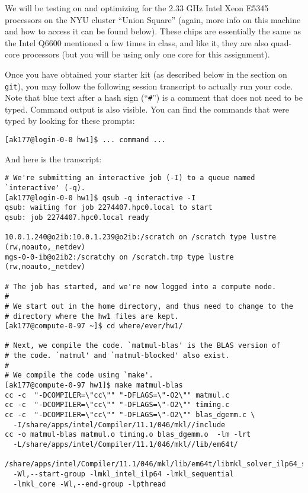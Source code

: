 \documentclass[11pt]{article}
\begin{document}
\begin{enumerate}
\begin{itemize}
\end{itemize}


We will be testing on and optimizing for the 2.33 GHz Intel Xeon E5345
processors on the NYU cluster ``Union Square'' (again, more info on
this machine and how to access it can be found below). These chips are
essentially the same as the Intel Q6600 mentioned a few times in
class, and like it, they are also quad-core processors (but you will
be using only one core for this assignment).

Once you have obtained your starter kit (as described below in the
section on \texttt{git}), you may follow the following session
transcript to actually run your code. Note that blue text after a hash
sign (``\texttt{\#}'') is a comment that does not need to be typed.
Command output is also visible. You can find the commands that were
typed by looking for these prompts:
\begin{lstlisting}
[ak177@login-0-0 hw1]$ ... command ...
\end{lstlisting}

And here is the transcript:

\begin{lstlisting}
# We're submitting an interactive job (-I) to a queue named `interactive' (-q).
[ak177@login-0-0 hw1]$ qsub -q interactive -I
qsub: waiting for job 2274407.hpc0.local to start
qsub: job 2274407.hpc0.local ready

10.0.1.240@o2ib:10.0.1.239@o2ib:/scratch on /scratch type lustre (rw,noauto,_netdev)
mgs-0-0-ib@o2ib2:/scratchy on /scratch.tmp type lustre (rw,noauto,_netdev)

# The job has started, and we're now logged into a compute node.
#
# We start out in the home directory, and thus need to change to the
# directory where the hw1 files are kept.
[ak177@compute-0-97 ~]$ cd where/ever/hw1/

# Next, we compile the code. `matmul-blas' is the BLAS version of
# the code. `matmul' and `matmul-blocked' also exist.
#
# We compile the code using `make'.
[ak177@compute-0-97 hw1]$ make matmul-blas
cc -c  "-DCOMPILER=\"cc\"" "-DFLAGS=\"-O2\"" matmul.c
cc -c  "-DCOMPILER=\"cc\"" "-DFLAGS=\"-O2\"" timing.c
cc -c  "-DCOMPILER=\"cc\"" "-DFLAGS=\"-O2\"" blas_dgemm.c \
  -I/share/apps/intel/Compiler/11.1/046/mkl//include
cc -o matmul-blas matmul.o timing.o blas_dgemm.o  -lm -lrt
  -L/share/apps/intel/Compiler/11.1/046/mkl//lib/em64t/
  /share/apps/intel/Compiler/11.1/046/mkl/lib/em64t/libmkl_solver_ilp64_sequential.a
  -Wl,--start-group -lmkl_intel_ilp64 -lmkl_sequential
  -lmkl_core -Wl,--end-group -lpthread


\end{lstlisting}
\end{enumerate}
\end{document}

